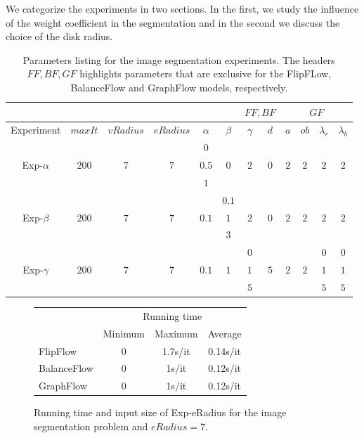 We categorize the experiments in two sections. In the first, we study the influence of the weight coefficient in the segmentation and in the second we discuss the choice of the disk radius.


\begin{table}
\centering
\begin{tabular}{|c|c|c|c|c|c|c|c|c|c|c|c|}
\cline{7-12}
\multicolumn{6}{c|}{} & \multicolumn{2}{|c|}{$FF,BF$} & \multicolumn{4}{|c|}{$GF$}\\
\hline
Experiment & $maxIt$ & $vRadius$ & $eRadius$ & $\alpha$ & $\beta$  & $\gamma$ & $d$ & $a$ & $ob$ & $\lambda_r$ & $\lambda_b$ \\
\hline
\multirow{3}{*}{Exp-$\alpha$} & \multirow{3}{*}{$200$} & \multirow{3}{*}{$7$} & \multirow{3}{*}{$7$} & $0$ & \multirow{3}{*}{$0$} & \multirow{3}{*}{$2$} & \multirow{3}{*}{$0$} & \multirow{3}{*}{$2$} & \multirow{3}{*}{$2$} & \multirow{3}{*}{$2$} & \multirow{3}{*}{$2$} \\
&  & & & $0.5$ & & & & & & &\\
&  & & & $1$ & & & & & & &\\
\hline
\multirow{3}{*}{Exp-$\beta$} & \multirow{3}{*}{$200$} & \multirow{3}{*}{$7$} & \multirow{3}{*}{$7$} & \multirow{3}{*}{$0.1$} & $0.1$ & \multirow{3}{*}{$2$} & \multirow{3}{*}{$0$} & \multirow{3}{*}{$2$} & \multirow{3}{*}{$2$} & \multirow{3}{*}{$2$} & \multirow{3}{*}{$2$} \\
&  & & & & $1$ & & & & & &\\
&  & & & & $3$ & & & & & &\\
\hline
\multirow{3}{*}{Exp-$\gamma$} & \multirow{3}{*}{$200$} & \multirow{3}{*}{$7$} & \multirow{3}{*}{$7$} & \multirow{3}{*}{$0.1$} & \multirow{3}{*}{$1$} & $0$ & \multirow{3}{*}{$5$} & \multirow{3}{*}{$2$} & \multirow{3}{*}{$2$} & $0$ & $0$ \\
&  & & & & & $1$ & & & & $1$ & $1$\\
&  & & & & & $5$ & & & & $5$ & $5$\\
\hline
\end{tabular}
\caption{Parameters listing for the image segmentation experiments. The headers $FF,BF,GF$ highlights parameters that are exclusive for the FlipFLow, BalanceFlow and GraphFlow models, respectively.}
\label{tab:image-segmentation-parameters-summary}
\end{table}

\begin{figure}
\center
\captionsetup{type=table}
\begin{tabular}{|l|c|c|c|}
\hline
& \multicolumn{3}{|c|}{Running time}\\
& Minimum & Maximum & Average \\
\hline
FlipFlow & 0 & 1.7s/it & 0.14s/it\\
BalanceFlow & 0 & 1s/it & 0.12s/it\\
GraphFlow & 0 & 1s/it & 0.12s/it\\
\hline
\end{tabular}
\caption{Running time and input size of Exp-eRadius for the image segmentation problem and $eRadius=7$.}
\label{tab:rtime-image-segmentation-general} 
\end{figure}

